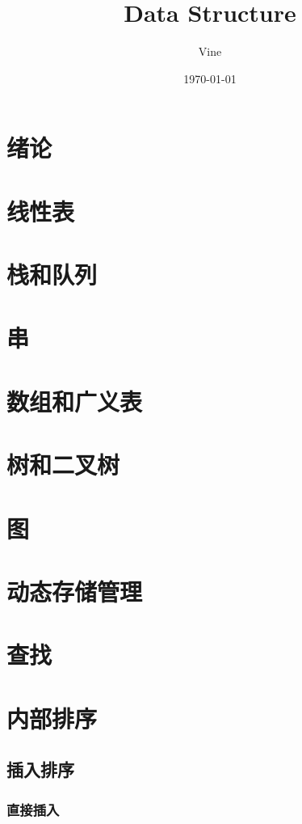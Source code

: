 \documentclass[UTF8]{ctexart}
\title{Data Structure}
\author{Vine}
\date{\today}
\begin{document}
    

\setlength{\headheight}{15pt}
\maketitle %
\newpage
\tableofcontents{}

\newpage
\section{绪论}
\newpage
\section{线性表}
\newpage
\section{栈和队列}
\newpage
\section{串}
\newpage
\section{数组和广义表}
\newpage
\section{树和二叉树}
\newpage
\section{图}
\newpage
\section{动态存储管理}
\newpage
\section{查找}

\newpage
\section{内部排序}
\subsection{插入排序}
\subsubsection{直接插入}
\end{document}
